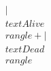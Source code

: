 \documentclass[preview]{standalone}
\begin{document}
\begin{align*}
|\\text{Alive}\\rangle + |\\text{Dead}\\rangle
\end{align*}
\end{document}
